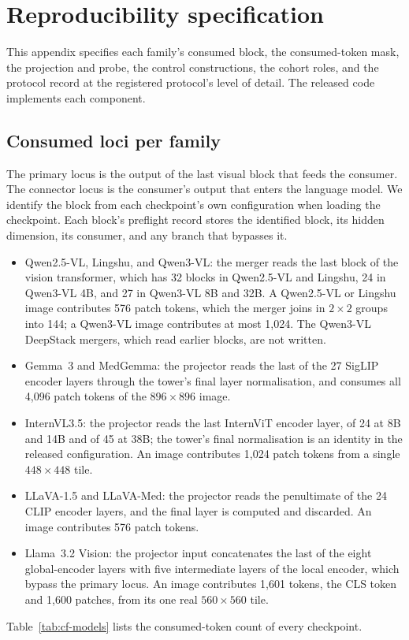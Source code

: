 \section{Reproducibility specification}
\label{app:repro}

This appendix specifies each family's consumed block, the consumed-token mask, the projection and probe, the control constructions, the cohort roles, and the protocol record at the registered protocol's level of detail. The released code implements each component.

\subsection{Consumed loci per family}
\label{app:repro-loci}

The primary locus is the output of the last visual block that feeds the consumer. The connector locus is the consumer's output that enters the language model. We identify the block from each checkpoint's own configuration when loading the checkpoint. Each block's preflight record stores the identified block, its hidden dimension, its consumer, and any branch that bypasses it.

\begin{itemize}[leftmargin=*,itemsep=1pt,topsep=2pt]
\item Qwen2.5-VL, Lingshu, and Qwen3-VL: the merger reads the last block of the vision transformer, which has 32 blocks in Qwen2.5-VL and Lingshu, 24 in Qwen3-VL 4B, and 27 in Qwen3-VL 8B and 32B. A Qwen2.5-VL or Lingshu image contributes 576 patch tokens, which the merger joins in $2\times2$ groups into 144; a Qwen3-VL image contributes at most 1{,}024. The Qwen3-VL DeepStack mergers, which read earlier blocks, are not written.
\item Gemma~3 and MedGemma: the projector reads the last of the 27 SigLIP encoder layers through the tower's final layer normalisation, and consumes all 4{,}096 patch tokens of the $896\times896$ image.
\item InternVL3.5: the projector reads the last InternViT encoder layer, of 24 at 8B and 14B and of 45 at 38B; the tower's final normalisation is an identity in the released configuration. An image contributes 1{,}024 patch tokens from a single $448\times448$ tile.
\item LLaVA-1.5 and LLaVA-Med: the projector reads the penultimate of the 24 CLIP encoder layers, and the final layer is computed and discarded. An image contributes 576 patch tokens.
\item Llama~3.2 Vision: the projector input concatenates the last of the eight global-encoder layers with five intermediate layers of the local encoder, which bypass the primary locus. An image contributes 1{,}601 tokens, the CLS token and 1{,}600 patches, from its one real $560\times560$ tile.
\end{itemize}
Table~\ref{tab:cf-models} lists the consumed-token count of every checkpoint.

